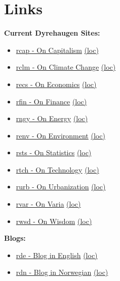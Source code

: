 \documentclass[
]{book}
\providecommand{\tightlist}{%
  \setlength{\itemsep}{0pt}\setlength{\parskip}{0pt}}
\begin{document}
\hypertarget{links}{%
\chapter{Links}\label{links}}

\textbf{Current Dyrehaugen Sites:}

\begin{itemize}
\tightlist
\item
  \href{https://dyrehaugen.github.io/rcap}{rcap - On Capitalism} \href{http://localhost/rcap}{(loc)}
\item
  \href{https://dyrehaugen.github.io/rclm}{rclm - On Climate Change} \href{http://localhost/rclm}{(loc)}
\item
  \href{https://dyrehaugen.github.io/recs}{recs - On Economics} \href{http://localhost/recs}{(loc)}
\item
  \href{https://dyrehaugen.github.io/rngy}{rfin - On Finance} \href{http://localhost/rfin}{(loc)}
\item
  \href{https://dyrehaugen.github.io/rngy}{rngy - On Energy} \href{http://localhost/rngy}{(loc)}
\item
  \href{https://dyrehaugen.github.io/renv}{renv - On Environment} \href{http://localhost/renv}{(loc)}
\item
  \href{https://dyrehaugen.github.io/rsts}{rsts - On Statistics} \href{http://localhost/rsts}{(loc)}
\item
  \href{https://dyrehaugen.github.io/rtch}{rtch - On Technology} \href{http://localhost/rtch}{(loc)}
\item
  \href{https://dyrehaugen.github.io/rurb}{rurb - On Urbanization} \href{http://localhost/rurb}{(loc)}
\item
  \href{https://dyrehaugen.github.io/rvar}{rvar - On Varia} \href{http://localhost/rvar}{(loc)}
\item
  \href{https://dyrehaugen.github.io/rwsd}{rwsd - On Wisdom} \href{http://localhost/rwsd}{(loc)}
\end{itemize}

\textbf{Blogs:}

\begin{itemize}
\tightlist
\item
  \href{https://dyrehaugen.github.io/rde}{rde - Blog in English} \href{http://localhost/rde}{(loc)}
\item
  \href{https://dyrehaugen.github.io/rdn}{rdn - Blog in Norwegian} \href{http://localhost/rdn}{(loc)}
\end{itemize}
\end{document}
